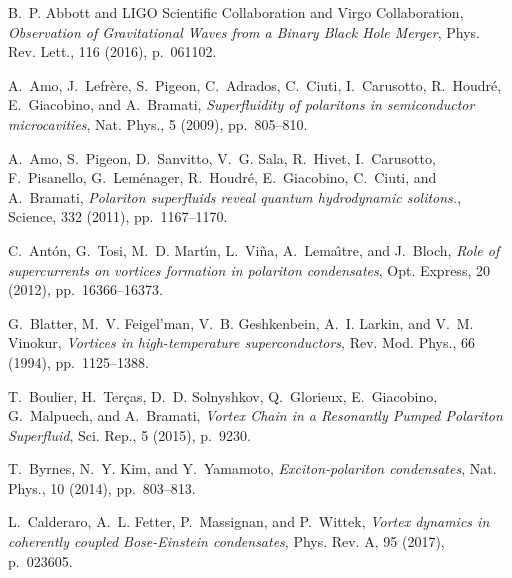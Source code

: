 \documentclass[aps,prb,twocolumn,superscriptaddress,nofootinbib]{revtex4}
\begin{document}
\bigskip

%
%
%
%
%

\def\bibsection{\section*{\refname}} 

%


\begin{thebibliography}{10}

{\sc B.~P. Abbott and {LIGO Scientific Collaboration and Virgo Collaboration}},
  {\em Observation of {Gravitational} {Waves} from a {Binary} {Black} {Hole}
  {Merger}}, Phys. Rev. Lett., 116 (2016), p.~061102.

{\sc A.~Amo, J.~Lefr\`{e}re, S.~Pigeon, C.~Adrados, C.~Ciuti, I.~Carusotto,
  R.~Houdr\'{e}, E.~Giacobino, and A.~Bramati}, {\em {Superfluidity of
  polaritons in semiconductor microcavities}}, Nat. Phys., 5 (2009),
  pp.~805--810.

{\sc A.~Amo, S.~Pigeon, D.~Sanvitto, V.~G. Sala, R.~Hivet, I.~Carusotto,
  F.~Pisanello, G.~Lem\'{e}nager, R.~Houdr\'{e}, E.~Giacobino, C.~Ciuti, and
  A.~Bramati}, {\em {Polariton superfluids reveal quantum hydrodynamic
  solitons.}}, Science, 332 (2011), pp.~1167--1170.

{\sc C.~Ant\'{o}n, G.~Tosi, M.~D. Mart\'{\i}n, L.~Vi\~{n}a, A.~Lema\^{\i}tre,
  and J.~Bloch}, {\em {Role of supercurrents on vortices formation in polariton
  condensates}}, Opt. Express, 20 (2012), pp.~16366--16373.

{\sc G.~Blatter, M.~V. Feigel'man, V.~B. Geshkenbein, A.~I. Larkin, and V.~M.
  Vinokur}, {\em Vortices in high-temperature superconductors}, Rev. Mod.
  Phys., 66 (1994), pp.~1125--1388.

{\sc T.~Boulier, H.~Ter\c{c}as, D.~D. Solnyshkov, Q.~Glorieux, E.~Giacobino,
  G.~Malpuech, and A.~Bramati}, {\em {Vortex Chain in a Resonantly Pumped
  Polariton Superfluid}}, Sci. Rep., 5 (2015), p.~9230.

{\sc T.~Byrnes, N.~Y. Kim, and Y.~Yamamoto}, {\em Exciton-polariton
  condensates}, Nat. Phys., 10 (2014), pp.~803--813.

{\sc L.~Calderaro, A.~L. Fetter, P.~Massignan, and P.~Wittek}, {\em Vortex
  dynamics in coherently coupled {Bose}-{Einstein} condensates}, Phys. Rev. A,
  95 (2017), p.~023605.


\end{thebibliography}
\end{document}
